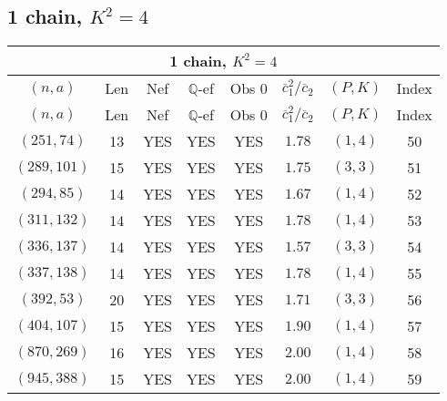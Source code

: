 \subsection{1 chain, $K^2 = 4$}
\begin{longtable}{|c|c|c|c|c|c|c|c|}
\hline
\multicolumn{8}{|c|}{1 chain, $K^2 = 4$}\\
\hline
$(n,a)$ & Len & Nef & $\mathbb Q$-ef & Obs 0 & $\overline c_1^2 / \overline c_2$ & $(P,K)$ & Index\\
\hline
\endfirsthead

\hline
$(n,a)$ & Len & Nef & $\mathbb Q$-ef & Obs 0 & $\overline c_1^2 / \overline c_2$ & $(P,K)$ & Index\\
\hline
\endhead
\hline
\endfoot

$(251,74)$ & 13 & YES & YES & YES & $1.78$ & $(1,4)$ & 50\\
$(289,101)$ & 15 & YES & YES & YES & $1.75$ & $(3,3)$ & 51\\
$(294,85)$ & 14 & YES & YES & YES & $1.67$ & $(1,4)$ & 52\\
$(311,132)$ & 14 & YES & YES & YES & $1.78$ & $(1,4)$ & 53\\
$(336,137)$ & 14 & YES & YES & YES & $1.57$ & $(3,3)$ & 54\\
$(337,138)$ & 14 & YES & YES & YES & $1.78$ & $(1,4)$ & 55\\
$(392,53)$ & 20 & YES & YES & YES & $1.71$ & $(3,3)$ & 56\\
$(404,107)$ & 15 & YES & YES & YES & $1.90$ & $(1,4)$ & 57\\
$(870,269)$ & 16 & YES & YES & YES & $2.00$ & $(1,4)$ & 58\\
$(945,388)$ & 15 & YES & YES & YES & $2.00$ & $(1,4)$ & 59
\end{longtable}
